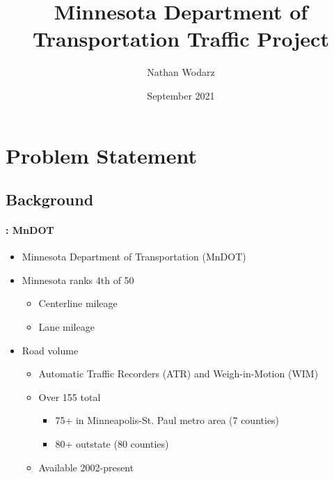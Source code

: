 {
}

\title{Minnesota Department of Transportation Traffic Project}
\author{Nathan Wodarz}
\date{September 2021}



\titleframe
\section{Problem Statement}
\subsection{Background}
\begin{frame}{\insertsectionhead}
  \framesubtitle{\insertsubsectionhead: MnDOT}
	\begin{itemize}
		\item<+-> \alert{Minnesota Department of Transportation} (MnDOT)
		\item<+-> Minnesota ranks 4th of 50
		\begin{itemize}
			\item<+-> Centerline mileage
			\item<+-> Lane mileage
		\end{itemize}
		\item<+-> Road volume
		\begin{itemize}
			\item<+-> Automatic Traffic Recorders (ATR) and Weigh-in-Motion (WIM)
			\item<+-> Over 155 total
			\begin{itemize}
				\item<+-> 75+ in Minneapolis-St. Paul metro area (7 counties)
				\item<+-> 80+ outstate (80 counties)
			\end{itemize}
			\item<+-> Available 2002-present
		\end{itemize}
	\end{itemize}
\end{frame}

